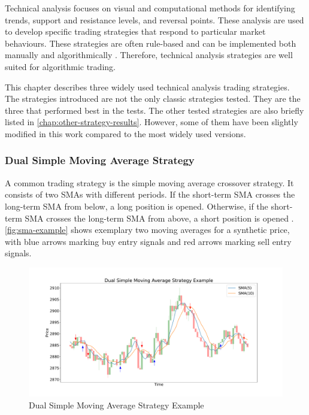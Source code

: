 Technical analysis focuses on visual and computational methods for identifying trends, support and resistance levels, and reversal points.
These analysis are used to develop specific trading strategies that respond to particular market behaviours.
These strategies are often rule-based and can be implemented both manually and algorithmically \cite{ta-basics}.
Therefore, technical analysis strategies are well suited for algorithmic trading.

This chapter describes three widely used technical analysis trading strategies.
The strategies introduced are not the only classic strategies tested.
They are the three that performed best in the tests.
The other tested strategies are also briefly listed in \autoref{chap:other-strategy-results}.
However, some of them have been slightly modified in this work compared to the most widely used versions.

\subsubsection{Dual Simple Moving Average Strategy}
\label{chap:sma2}

A common trading strategy is the simple moving average crossover strategy.
It consists of two SMAs with different periods.
If the short-term SMA crosses the long-term SMA from below, a long position is opened.
Otherwise, if the short-term SMA crosses the long-term SMA from above, a short position is opened \cite{sma-strategy-basics}.
\autoref{fig:sma-example} shows exemplary two moving averages for a synthetic price, with blue arrows marking buy entry signals and red arrows marking sell entry signals.

\begin{figure}[H]
    \centering
    \includegraphics[width=\textwidth]{images/trading-strategies/sma-example}
    \caption{Dual Simple Moving Average Strategy Example}
    \label{fig:sma-example}
\end{figure}

